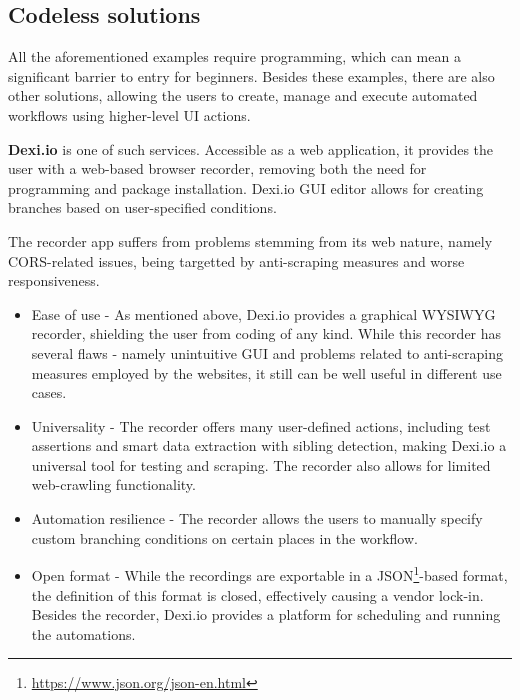 \subsection{Codeless solutions}

All the aforementioned examples require programming, which can mean a significant barrier to entry for beginners.
Besides these examples, there are also other solutions, allowing the users to create, manage and execute automated workflows using higher-level UI actions.

\emptyline

\textbf{Dexi.io} is one of such services. 
Accessible as a web application, it provides the user with a web-based browser recorder, removing both the need for programming and package installation.
Dexi.io \ac{GUI} editor allows for creating branches based on user-specified conditions.

The recorder app suffers from problems stemming from its web nature, namely \acs{CORS}-related issues, being targetted by anti-scraping measures and worse responsiveness.

\begin{itemize}
    \item Ease of use - As mentioned above, Dexi.io provides a graphical \acs{WYSIWYG} recorder, shielding the user from coding of any kind.
    While this recorder has several flaws - namely unintuitive \ac{GUI} and problems related to anti-scraping measures employed by the websites, it still can be well useful in different use cases.

    \item Universality - The recorder offers many user-defined actions, including test assertions and smart data extraction with sibling detection, making Dexi.io a universal tool for testing and scraping. 
    The recorder also allows for limited web-crawling functionality.

    \item Automation resilience -
    The recorder allows the users to manually specify custom branching conditions on certain places in the workflow.
    
    \item Open format - While the recordings are exportable in a JSON\footnote{\href{https://www.json.org/json-en.html}{https://www.json.org/json-en.html}}-based format, the definition of this format is closed, effectively causing a vendor lock-in.
    Besides the recorder, Dexi.io provides a platform for scheduling and running the automations.
\end{itemize}

